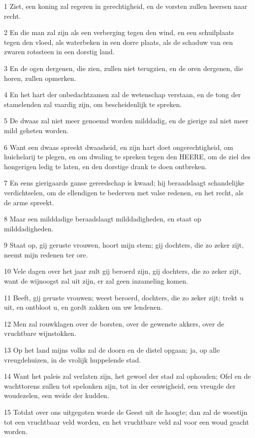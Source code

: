 \par 1 Ziet, een koning zal regeren in gerechtigheid, en de vorsten zullen heersen naar recht.
\par 2 En die man zal zijn als een verberging tegen den wind, en een schuilplaats tegen den vloed, als waterbeken in een dorre plaats, als de schaduw van een zwaren rotssteen in een dorstig land.
\par 3 En de ogen dergenen, die zien, zullen niet terugzien, en de oren dergenen, die horen, zullen opmerken.
\par 4 En het hart der onbedachtzamen zal de wetenschap verstaan, en de tong der stamelenden zal vaardig zijn, om bescheidenlijk te spreken.
\par 5 De dwaas zal niet meer genoemd worden milddadig, en de gierige zal niet meer mild geheten worden.
\par 6 Want een dwaas spreekt dwaasheid, en zijn hart doet ongerechtigheid, om huichelarij te plegen, en om dwaling te spreken tegen den HEERE, om de ziel des hongerigen ledig te laten, en den dorstige drank te doen ontbreken.
\par 7 En eens gierigaards ganse gereedschap is kwaad; hij beraadslaagt schandelijke verdichtselen, om de ellendigen te bederven met valse redenen, en het recht, als de arme spreekt.
\par 8 Maar een milddadige beraadslaagt milddadigheden, en staat op milddadigheden.
\par 9 Staat op, gij geruste vrouwen, hoort mijn stem; gij dochters, die zo zeker zijt, neemt mijn redenen ter ore.
\par 10 Vele dagen over het jaar zult gij beroerd zijn, gij dochters, die zo zeker zijt, want de wijnoogst zal uit zijn, er zal geen inzameling komen.
\par 11 Beeft, gij geruste vrouwen; weest beroerd, dochters, die zo zeker zijt; trekt u uit, en ontbloot u, en gordt zakken om uw lendenen.
\par 12 Men zal rouwklagen over de borsten, over de gewenste akkers, over de vruchtbare wijnstokken.
\par 13 Op het land mijns volks zal de doorn en de distel opgaan; ja, op alle vreugdehuizen, in de vrolijk huppelende stad.
\par 14 Want het paleis zal verlaten zijn, het gewoel der stad zal ophouden; Ofel en de wachttorens zullen tot spelonken zijn, tot in der eeuwigheid, een vreugde der woudezelen, een weide der kudden.
\par 15 Totdat over ons uitgegoten worde de Geest uit de hoogte; dan zal de woestijn tot een vruchtbaar veld worden, en het vruchtbare veld zal voor een woud geacht worden.

